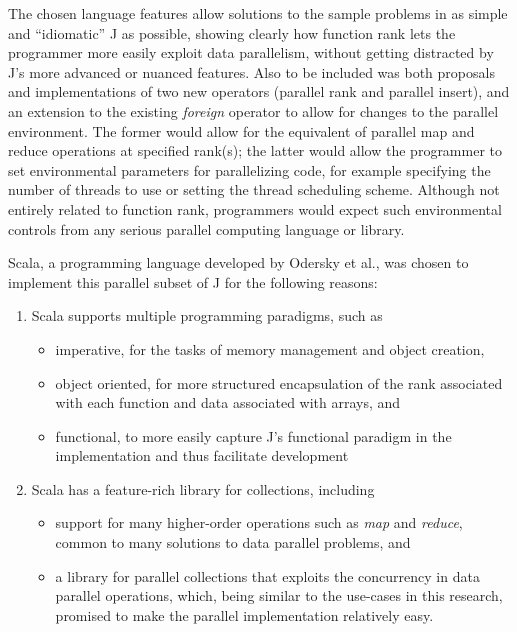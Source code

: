 The chosen language features allow solutions to the sample problems in as simple and ``idiomatic'' J as possible, 
showing clearly how function rank lets the programmer more easily exploit data parallelism,
without getting distracted by J's more advanced or nuanced features. 
Also to be included was both proposals and implementations of two new operators (parallel rank and parallel insert), 
and an extension to the existing \textit{foreign} operator to allow for changes to the parallel environment. 
The former would allow for the equivalent of parallel map and reduce operations at specified rank(s); 
the latter would allow the programmer to set environmental parameters for parallelizing code, 
for example specifying the number of threads to use or setting the thread scheduling scheme.
Although not entirely related to function rank, programmers would expect such environmental controls 
from any serious parallel computing language or library.

Scala, a programming language developed by Odersky et al.\cite{scala}, 
was chosen to implement this parallel subset of J for the following reasons:
\begin{enumerate} 
	\item Scala supports multiple programming paradigms, such as
	\begin{itemize}
		\item imperative, for the tasks of memory management and object creation,
		\item object oriented, for more structured encapsulation of the rank associated with each function 
			and data associated with arrays, and
		\item functional, to more easily capture J's functional paradigm in the implementation and thus facilitate development
	\end{itemize}
	\item Scala has a feature-rich library for collections, including 
	\begin{itemize}
		\item support for many higher-order operations such as \textit{map} and \textit{reduce}, 
			common to many solutions to data parallel problems\cite{scala28col}, and
		\item a library for parallel collections that exploits the concurrency in data parallel operations\cite{pc},
			which, being similar to the use-cases in this research, promised to make the parallel implementation relatively easy.
	\end{itemize}
\end{enumerate}

